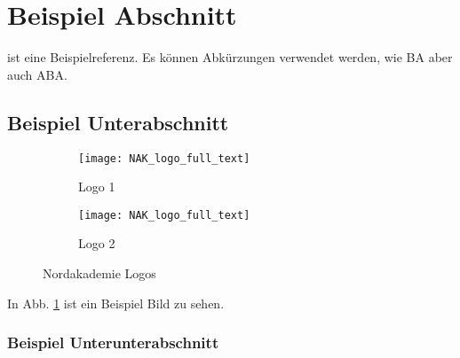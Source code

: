 \section{Beispiel Abschnitt}
\cite{latex_companion} ist eine Beispielreferenz.
Es können Abkürzungen verwendet werden, wie \ac{BA} aber auch \ac{ABA}.

\subsection{Beispiel Unterabschnitt}

\begin{figure}[h]
    \centering

    \begin{subfigure}{.4\textwidth}
        \centering
        \texttt{[image: NAK\_logo\_full\_text]}
        \caption{Logo 1}
        \label{fig:subfig1}
    \end{subfigure}
    \begin{subfigure}{.4\textwidth}
        \centering
        \texttt{[image: NAK\_logo\_full\_text]}
        \caption{Logo 2}
        \label{fig:subfig2}
    \end{subfigure}

    \caption{Nordakademie Logos}
    \label{fig:fig}
\end{figure}

In Abb. \ref{fig:subfig1} ist ein Beispiel Bild zu sehen.

\subsubsection{Beispiel Unterunterabschnitt}

\Blindtext{}
